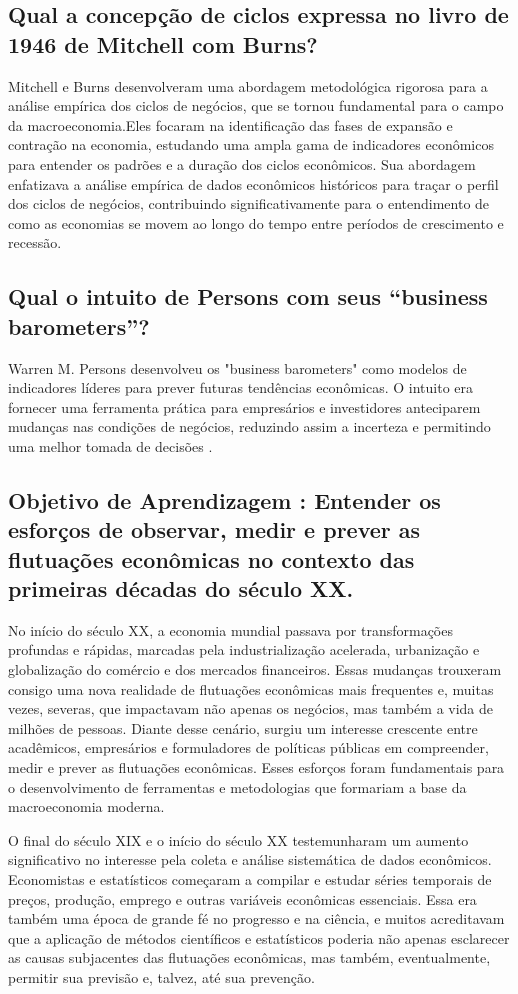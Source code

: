 \documentclass[a4paper,12pt]{article}[abntex2]
\begin{document}
\subsection{\textbf{Qual a concepção de ciclos expressa no livro de 1946 de Mitchell com Burns?}}
Mitchell e Burns desenvolveram uma abordagem metodológica rigorosa para a análise empírica dos ciclos de negócios, que se tornou fundamental para o campo da macroeconomia.Eles focaram na identificação das fases de expansão e contração na economia, estudando uma ampla gama de indicadores econômicos para entender os padrões e a duração dos ciclos econômicos. Sua abordagem enfatizava a análise empírica de dados econômicos históricos para traçar o perfil dos ciclos de negócios, contribuindo significativamente para o entendimento de como as economias se movem ao longo do tempo entre períodos de crescimento e recessão.
\subsection{\textbf{Qual o intuito de Persons com seus “business barometers”?}}
Warren M. Persons desenvolveu os "business barometers" como modelos de indicadores líderes para prever futuras tendências econômicas. O intuito era fornecer uma ferramenta prática para empresários e investidores anteciparem mudanças nas condições de negócios, reduzindo assim a incerteza e permitindo uma melhor tomada de decisões .
\subsection{\textbf{Objetivo de Aprendizagem : Entender os esforços de observar, medir e prever as flutuações econômicas no contexto das primeiras décadas do século XX.}}
No início do século XX, a economia mundial passava por transformações profundas e rápidas, marcadas pela industrialização acelerada, urbanização e globalização do comércio e dos mercados financeiros. Essas mudanças trouxeram consigo uma nova realidade de flutuações econômicas mais frequentes e, muitas vezes, severas, que impactavam não apenas os negócios, mas também a vida de milhões de pessoas. Diante desse cenário, surgiu um interesse crescente entre acadêmicos, empresários e formuladores de políticas públicas em compreender, medir e prever as flutuações econômicas. Esses esforços foram fundamentais para o desenvolvimento de ferramentas e metodologias que formariam a base da macroeconomia moderna.

O final do século XIX e o início do século XX testemunharam um aumento significativo no interesse pela coleta e análise sistemática de dados econômicos. Economistas e estatísticos começaram a compilar e estudar séries temporais de preços, produção, emprego e outras variáveis econômicas essenciais. Essa era também uma época de grande fé no progresso e na ciência, e muitos acreditavam que a aplicação de métodos científicos e estatísticos poderia não apenas esclarecer as causas subjacentes das flutuações econômicas, mas também, eventualmente, permitir sua previsão e, talvez, até sua prevenção.
\end{document}
